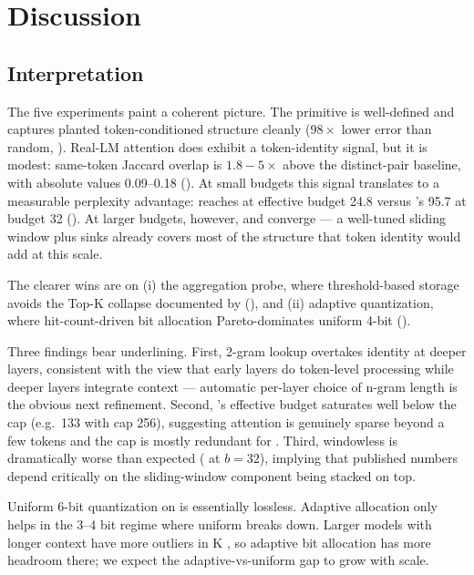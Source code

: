 \section{Discussion}
\label{sec:discussion}

\subsection{Interpretation}

The five experiments paint a coherent picture. The \hma primitive is well-defined and captures planted token-conditioned structure cleanly ($98\times$ lower error than random, ). Real-LM attention does exhibit a token-identity signal, but it is modest: same-token Jaccard overlap is $1.8{-}5\times$ above the distinct-pair baseline, with absolute values 0.09--0.18 (). At small \kvcache budgets this signal translates to a measurable perplexity advantage: \hmaid reaches  at effective budget 24.8 versus \streaming's 95.7 at budget 32 (). At larger budgets, however, \streaming and \hma converge --- a well-tuned sliding window plus sinks already covers most of the structure that token identity would add at this scale.

The clearer wins are on (i) the aggregation probe, where threshold-based storage avoids the Top-K collapse documented by \magicpig (), and (ii) adaptive \kvcache quantization, where hit-count-driven bit allocation Pareto-dominates uniform 4-bit ().

 Three findings bear underlining. First, 2-gram lookup overtakes identity at deeper layers, consistent with the view that early layers do token-level processing while deeper layers integrate context --- automatic per-layer choice of n-gram length is the obvious next refinement. Second, \hma's effective budget saturates well below the cap (e.g.\ 133 with cap 256), suggesting attention is genuinely sparse beyond a few tokens and the cap is mostly redundant for \hma. Third, windowless \hto is dramatically worse than expected ( at $b = 32$), implying that published \hto numbers depend critically on the sliding-window component being stacked on top.

 Uniform 6-bit \kvcache quantization on \gpttwo is essentially lossless. Adaptive allocation only helps in the 3--4 bit regime where uniform breaks down. Larger models with longer context have more outliers in K \citep{hooper2024kvquant}, so adaptive bit allocation has more headroom there; we expect the adaptive-vs-uniform gap to grow with scale.

